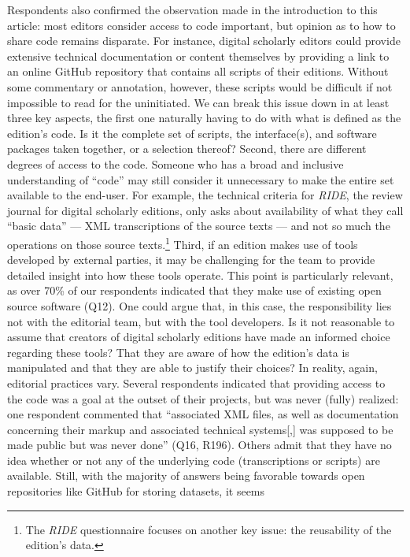 \begin{paper}
Respondents also confirmed the observation made in the introduction to
this article: most editors consider access to code important, but
opinion as to how to share code remains disparate. For instance, digital
scholarly editors could provide extensive technical documentation or
content themselves by providing a link to an online GitHub repository
that contains all scripts of their editions. Without some commentary or
annotation, however, these scripts would be difficult if not impossible
to read for the uninitiated. We can break this issue down in at least
three key aspects, the first one naturally having to do with what is
defined as the edition's code. Is it the complete set of scripts, the
interface(s), and software packages taken together, or a selection
thereof? Second, there are different degrees of access to the code.
Someone who has a broad and inclusive understanding of ``code'' may
still consider it unnecessary to make the entire set available to the
end-user. For example, the technical criteria for \emph{RIDE}, the
review journal for digital scholarly editions, only asks about
availability of what they call ``basic data'' --- XML transcriptions of the
source texts --- and not so much the operations on those source
texts.\footnote{The \emph{RIDE} questionnaire focuses on another key
  issue: the reusability of the edition's data.} Third, if an edition
makes use of tools developed by external parties, it may be challenging
for the team to provide detailed insight into how these tools operate.
This point is particularly relevant, as over 70\% of our respondents
indicated that they make use of existing open source software (Q12). One
could argue that, in this case, the responsibility lies not with the
editorial team, but with the tool developers. Is it not reasonable to
assume that creators of digital scholarly editions have made an informed
choice regarding these tools? That they are aware of how the edition's
data is manipulated and that they are able to justify their choices? In
reality, again, editorial practices vary. Several respondents indicated
that providing access to the code was a goal at the outset of their
projects, but was never (fully) realized: one respondent commented that
``associated XML files, as well as documentation concerning their markup
and associated technical systems{[},{]} was supposed to be made public
but was never done'' (Q16, R196). Others admit that they have no idea
whether or not any of the underlying code (transcriptions or scripts)
are available. Still, with the majority of answers being favorable
towards open repositories like GitHub for storing datasets, it seems

\end{paper}
